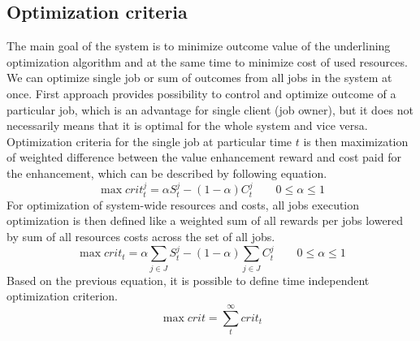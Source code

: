\subsection{Optimization criteria}\label{subsec:optimization-criteria}
The main goal of the system is to minimize outcome value of the underlining optimization algorithm
and at the same time to minimize cost of used resources.
We can optimize single job or sum of outcomes from all jobs in the system at once.
First approach provides possibility to control and optimize outcome of a particular job,
which is an advantage for single client (job owner),
but it does not necessarily means that it is optimal for the whole system and vice versa.
Optimization criteria for the single job at particular time $t$ is then
maximization of weighted difference between the value enhancement reward 
and cost paid for the enhancement,
which can be described by following equation.
\begin{equation}
	\max crit_{t}^{j} = \alpha S_{t}^{j} - (1 - \alpha) C_{t}^{j} \qquad 0 \leq \alpha \leq 1 
\end{equation}
For optimization of system-wide resources and costs,
all jobs execution optimization is then defined like a
weighted sum of all rewards per jobs lowered by sum of all resources costs across the set of all jobs.
\begin{equation}
	\max crit_{t} = \alpha \sum_{j \in J} S_{t}^{j} - (1 - \alpha) \sum_{j \in J} C_{t}^{j} \qquad 0 \leq \alpha \leq 1 
\end{equation}
Based on the previous equation, 
it is possible to define time independent optimization criterion.
\begin{equation}
	\max crit = \sum_{t}^{\infty} crit_{t}
\end{equation}